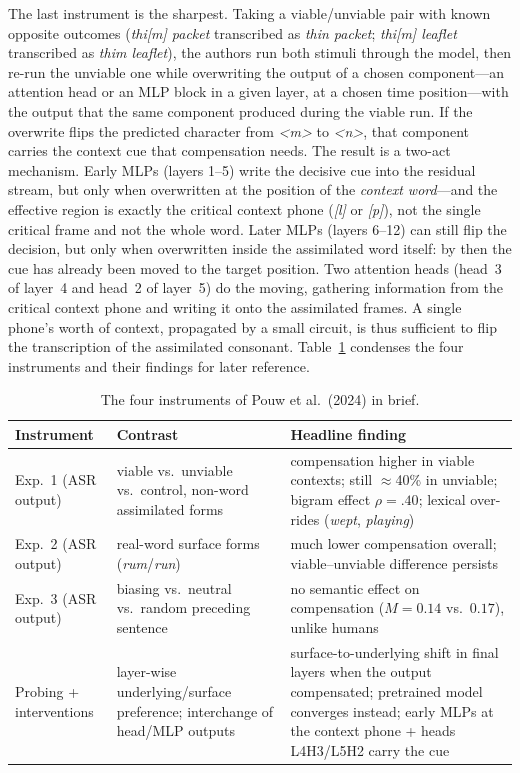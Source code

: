 \documentclass[11pt,a4paper]{article}
\begin{document}
The last instrument is the sharpest. Taking a viable/unviable pair with
known opposite outcomes (\emph{thi[m] packet} transcribed as \emph{thin
packet}; \emph{thi[m] leaflet} transcribed as \emph{thim leaflet}), the
authors run both stimuli through the model, then re-run the unviable
one while overwriting the output of a chosen component---an attention
head or an MLP block in a given layer, at a chosen time position---with
the output that the same component produced during the viable run. If
the overwrite flips the predicted character from \emph{<m>} to
\emph{<n>}, that component carries the context cue that compensation
needs. The result is a two-act mechanism. Early MLPs (layers 1--5)
write the decisive cue into the residual stream, but only when
overwritten at the position of the \emph{context word}---and the
effective region is exactly the critical context phone (\emph{[l]} or
\emph{[p]}), not the single critical frame and not the whole word.
Later MLPs (layers 6--12) can still flip the decision, but only when
overwritten inside the assimilated word itself: by then the cue has
already been moved to the target position. Two attention heads (head~3
of layer~4 and head~2 of layer~5) do the moving, gathering information
from the critical context phone and writing it onto the assimilated
frames. A single phone's worth of context, propagated by a small
circuit, is thus sufficient to flip the transcription of the
assimilated consonant. Table~\ref{tab:pouw} condenses the four
instruments and their findings for later reference.

\begin{table}[htbp]
\centering
\small
\caption{The four instruments of Pouw et al.\ (2024) in brief.}
\label{tab:pouw}
\begin{tabularx}{\textwidth}{@{}l X X@{}}
\toprule
Instrument & Contrast & Headline finding \\
\midrule
Exp.~1 (ASR output) & viable vs.\ unviable vs.\ control, non-word
assimilated forms & compensation higher in viable contexts; still
$\approx$40\% in unviable; bigram effect $\rho=.40$; lexical
over-rides (\emph{wept}, \emph{playing}) \\
Exp.~2 (ASR output) & real-word surface forms (\emph{rum}/\emph{run})
& much lower compensation overall; viable--unviable difference
persists \\
Exp.~3 (ASR output) & biasing vs.\ neutral vs.\ random preceding
sentence & no semantic effect on compensation ($M=0.14$ vs.\ $0.17$),
unlike humans \\
Probing + interventions & layer-wise underlying/surface preference;
interchange of head/MLP outputs & surface-to-underlying shift in final
layers when the output compensated; pretrained model converges
instead; early MLPs at the context phone + heads L4H3/L5H2 carry the
cue \\
\bottomrule
\end{tabularx}
\end{table}
\end{document}
